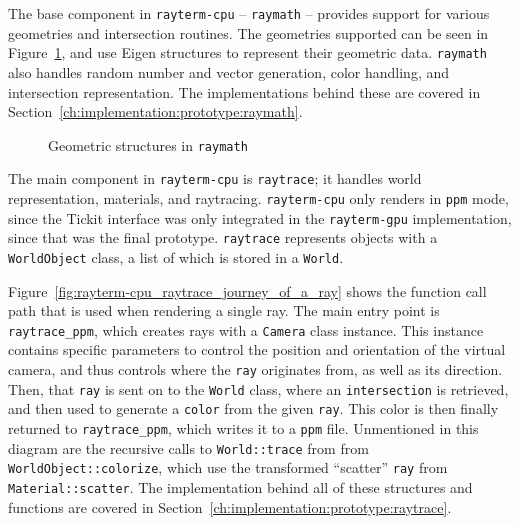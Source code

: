 The base component in \texttt{rayterm-cpu} -- \texttt{raymath} -- provides support for various geometries and intersection routines.
The geometries supported can be seen in Figure~\ref{fig:rayterm-cpu_raymath_geometry}, and use Eigen structures to represent their geometric data.
\texttt{raymath} also handles random number and vector generation, color handling, and intersection representation.
The implementations behind these are covered in Section~\ref{ch:implementation:prototype:raymath}.

\vspace{0.3em}
\begin{figure}[htb]
  \centering
  \caption{Geometric structures in \texttt{raymath}}
  \label{fig:rayterm-cpu_raymath_geometry}
\end{figure}

The main component in \texttt{rayterm-cpu} is \texttt{raytrace}; it handles world representation, materials, and raytracing.
\texttt{rayterm-cpu} only renders in \texttt{ppm} mode, since the Tickit interface was only integrated in the \texttt{rayterm-gpu} implementation, since that was the final prototype.
\texttt{raytrace} represents objects with a \texttt{WorldObject} class, a list of which is stored in a \texttt{World}.

Figure~\ref{fig:rayterm-cpu_raytrace_journey_of_a_ray} shows the function call path that is used when rendering a single ray.
The main entry point is \texttt{raytrace\_ppm}, which creates rays with a \texttt{Camera} class instance.
This instance contains specific parameters to control the position and orientation of the virtual camera, and thus controls where the \texttt{ray} originates from, as well as its direction.
Then, that \texttt{ray} is sent on to the \texttt{World} class, where an \texttt{intersection} is retrieved, and then used to generate a \texttt{color} from the given \texttt{ray}.
This color is then finally returned to \texttt{raytrace\_ppm}, which writes it to a \texttt{ppm} file.
Unmentioned in this diagram are the recursive calls to \texttt{World::trace} from from \texttt{WorldObject::colorize}, which use the transformed ``scatter'' \texttt{ray} from \texttt{Material::scatter}.
The implementation behind all of these structures and functions are covered in Section~\ref{ch:implementation:prototype:raytrace}.

